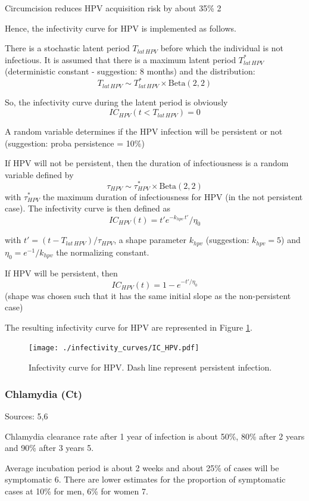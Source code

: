 \documentclass[11pt, onecolumn]{article}
\begin{document}
Circumcision reduces HPV acquisition risk by about 35\% 2

Hence, the infectivity curve for HPV is implemented as follows. 

There is a stochastic latent period $T_{lat\,HPV}$ before which the individual is not infectious. It is assumed that there is a maximum latent period $T_{lat\,HPV}^*$ (deterministic constant - suggestion: 8 months) and the distribution:
$$T_{lat\,HPV} \sim T_{lat\,HPV}^* \times \mathrm{Beta}(2,2) $$

So, the infectivity curve during the latent period is obviously
$$IC_{HPV}(t< T_{lat\,HPV}) = 0$$

A random variable determines if the HPV infection will be persistent or not (suggestion: proba persistence = 10\%)

If HPV will not be persistent, then the duration of infectiousness is a random variable defined by
$$\tau_{HPV} \sim \tau_{HPV}^*  \times   \mathrm{Beta}(2,2)$$
with $\tau_{HPV}^* $ the maximum duration of infectiousness for HPV (in the not persistent case). The infectivity curve is then defined as
$$IC_{HPV}(t) = t' e^{-k_{hpv}\, t' }/ \eta_0$$

with $t' = (t-T_{lat\,HPV})/\tau_{HPV} $, a shape parameter $k_{hpv}$ (suggestion: $k_{hpv}=5$) and $\eta_0=e^{-1}/k_{hpv}$ the normalizing constant.

If HPV will be persistent, then 
$$IC_{HPV}(t) = 1- e^{-t'/\eta_0 }$$
(shape was chosen such that it has the same initial slope as the non-persistent case)

The resulting infectivity curve for HPV are represented in Figure \ref{fig:ICHPV}.
\begin{figure}[!ht]
\centering
    \texttt{[image: ./infectivity\_curves/IC\_HPV.pdf]}
\caption{Infectivity curve for HPV. Dash line represent persistent infection.}
\label{fig:ICHPV}
\end{figure}



\subsubsection{Chlamydia (Ct)}

Sources: 5,6

Chlamydia clearance rate after 1 year of infection is about 50\%, 80\% after 2 years and 90\% after 3 years 5.

Average incubation period is about 2 weeks and about 25\% of cases will be symptomatic 6. There are lower estimates for the proportion of symptomatic cases at 10\% for men, 6\% for women 7.
\end{document}
